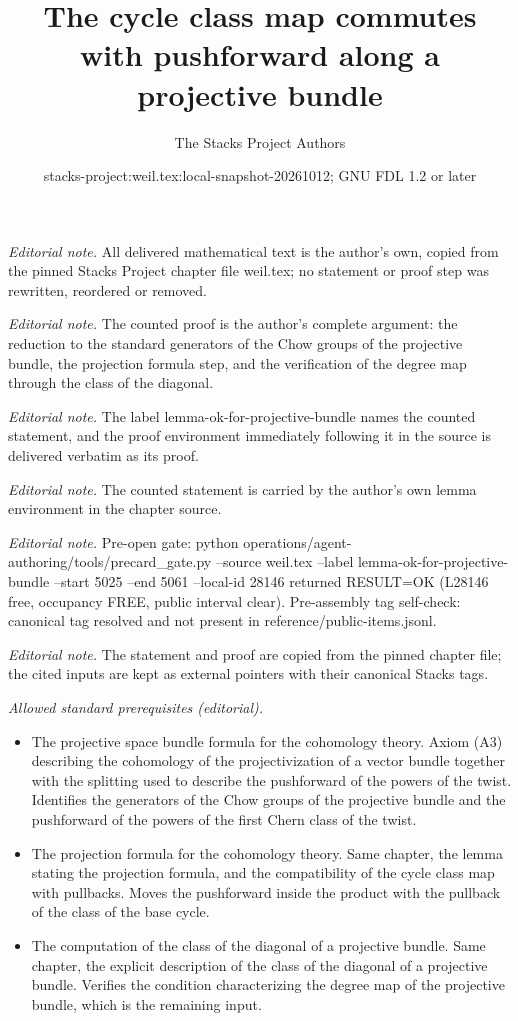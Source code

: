 \documentclass[10pt,a4paper]{amsart}
\title{The cycle class map commutes with pushforward along a projective bundle}
\author{The Stacks Project Authors}
\date{stacks-project:weil.tex:local-snapshot-20261012; GNU FDL 1.2 or later}
\theoremstyle{plain}
\theoremstyle{definition}
\theoremstyle{remark}
\numberwithin{equation}{subsection}
\begin{document}
\maketitle
\noindent\textit{Editorial note.} All delivered mathematical text is the author's own, copied from the pinned Stacks Project chapter file weil.tex; no statement or proof step was rewritten, reordered or removed.\par\medskip
\noindent\textit{Editorial note.} The counted proof is the author's complete argument: the reduction to the standard generators of the Chow groups of the projective bundle, the projection formula step, and the verification of the degree map through the class of the diagonal.\par\medskip
\noindent\textit{Editorial note.} The label lemma-ok-for-projective-bundle names the counted statement, and the proof environment immediately following it in the source is delivered verbatim as its proof.\par\medskip
\noindent\textit{Editorial note.} The counted statement is carried by the author's own lemma environment in the chapter source.\par\medskip
\noindent\textit{Editorial note.} Pre-open gate: python operations/agent-authoring/tools/precard\_gate.py --source weil.tex --label lemma-ok-for-projective-bundle --start 5025 --end 5061 --local-id 28146 returned RESULT=OK (L28146 free, occupancy FREE, public interval clear). Pre-assembly tag self-check: canonical tag resolved and not present in reference/public-items.jsonl.\par\medskip
\noindent\textit{Editorial note.} The statement and proof are copied from the pinned chapter file; the cited inputs are kept as external pointers with their canonical Stacks tags.\par\medskip
\noindent\textit{Allowed standard prerequisites (editorial).}\begin{itemize}
\item The projective space bundle formula for the cohomology theory. Axiom (A3) describing the cohomology of the projectivization of a vector bundle together with the splitting used to describe the pushforward of the powers of the twist. Identifies the generators of the Chow groups of the projective bundle and the pushforward of the powers of the first Chern class of the twist.
\item The projection formula for the cohomology theory. Same chapter, the lemma stating the projection formula, and the compatibility of the cycle class map with pullbacks. Moves the pushforward inside the product with the pullback of the class of the base cycle.
\item The computation of the class of the diagonal of a projective bundle. Same chapter, the explicit description of the class of the diagonal of a projective bundle. Verifies the condition characterizing the degree map of the projective bundle, which is the remaining input.
\end{itemize}\medskip
\end{document}
